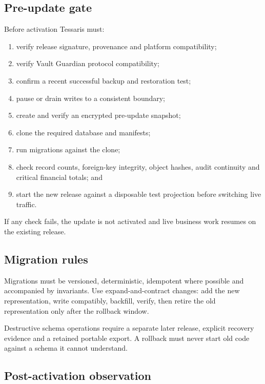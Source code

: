 \documentclass[11pt]{article}
\begin{document}
\subsection{Pre-update gate}

Before activation Tessaris must:

\begin{enumerate}
  \item verify release signature, provenance and platform compatibility;
  \item verify Vault Guardian protocol compatibility;
  \item confirm a recent successful backup and restoration test;
  \item pause or drain writes to a consistent boundary;
  \item create and verify an encrypted pre-update snapshot;
  \item clone the required database and manifests;
  \item run migrations against the clone;
  \item check record counts, foreign-key integrity, object hashes, audit continuity and critical financial totals; and
  \item start the new release against a disposable test projection before switching live traffic.
\end{enumerate}

If any check fails, the update is not activated and live business work resumes on the existing release.

\subsection{Migration rules}

Migrations must be versioned, deterministic, idempotent where possible and accompanied by invariants. Use expand-and-contract changes: add the new representation, write compatibly, backfill, verify, then retire the old representation only after the rollback window.

Destructive schema operations require a separate later release, explicit recovery evidence and a retained portable export. A rollback must never start old code against a schema it cannot understand.

\subsection{Post-activation observation}
\end{document}
